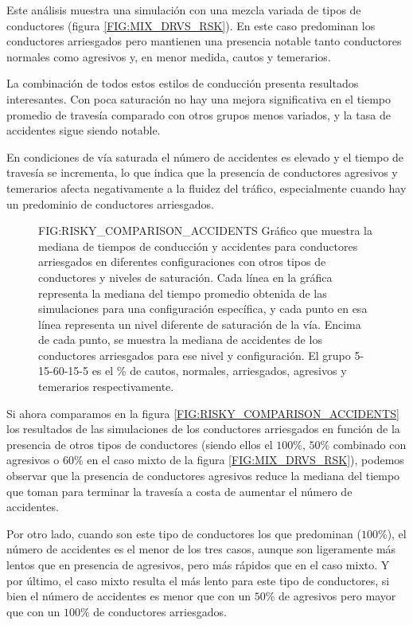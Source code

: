 Este análisis muestra una simulación con una mezcla variada de tipos de conductores (figura \ref{FIG:MIX_DRVS_RSK}).
En este caso predominan los conductores arriesgados pero mantienen una presencia notable tanto conductores normales como agresivos y,
en menor medida, cautos y temerarios.

La combinación de todos estos estilos de conducción presenta resultados interesantes. Con poca saturación
no hay una mejora significativa en el tiempo promedio de travesía comparado con otros grupos menos variados,
y la tasa de accidentes sigue siendo notable.

En condiciones de vía saturada el número de accidentes es elevado y el tiempo de travesía se incrementa,
lo que indica que la presencia de conductores agresivos y temerarios afecta negativamente a la fluidez del tráfico,
especialmente cuando hay un predominio de conductores arriesgados.

\begin{figure}[Mediana de tiempos y accidentes de conductores Arriesgados]{FIG:RISKY_COMPARISON_ACCIDENTS}{
    Gráfico que muestra la mediana de tiempos de conducción y accidentes para conductores arriesgados en diferentes configuraciones
    con otros tipos de conductores y niveles de saturación. Cada línea en la gráfica representa la mediana del tiempo promedio obtenida de las simulaciones para
    una configuración específica, y cada punto en esa línea representa un nivel diferente de saturación de la vía.
    Encima de cada punto, se muestra la mediana de accidentes de los conductores arriesgados para ese nivel y configuración.
    El grupo 5-15-60-15-5 es el \% de cautos, normales, arriesgados, agresivos y temerarios respectivamente.
}
\end{figure}

Si ahora comparamos en la figura \ref{FIG:RISKY_COMPARISON_ACCIDENTS} los resultados de las simulaciones de los conductores arriesgados
en función de la presencia de otros tipos de conductores (siendo ellos el $100\%$, $50\%$ combinado con agresivos o $60\%$ en el caso mixto de
la figura \ref{FIG:MIX_DRVS_RSK}), podemos observar que la presencia de conductores agresivos reduce la mediana del tiempo que toman
para terminar la travesía a costa de aumentar el número de accidentes.

Por otro lado, cuando son este tipo de conductores los que predominan ($100\%$), el número de accidentes es el menor de los tres casos,
aunque son ligeramente más lentos que en presencia de agresivos, pero más rápidos que en el caso mixto. Y por último, el caso mixto
resulta el más lento para este tipo de conductores, si bien el número de accidentes es menor que con un $50\%$ de agresivos pero mayor
que con un $100\%$ de conductores arriesgados.

